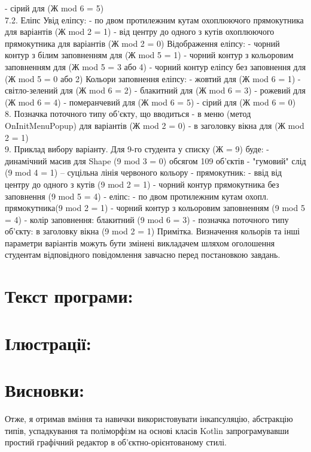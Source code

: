 \documentclass[14pt]{article}
\begin{document}
- сірий для (Ж mod 6 = 5) \\
7.2. Еліпс
Увід еліпсу:
- по двом протилежним кутам охоплюючого прямокутника для
варіантів (Ж mod 2 = 1)
- від центру до одного з кутів охоплюючого прямокутника для варіантів
(Ж mod 2 = 0)
Відображення еліпсу:
- чорний контур з білим заповненням для (Ж mod 5 = 1)
- чорний контур з кольоровим заповненням для (Ж mod 5 = 3 або 4)
- чорний контур еліпсу без заповнення для (Ж mod 5 = 0 або 2)
Кольори заповнення еліпсу:
- жовтий для (Ж mod 6 = 1)
- світло-зелений для (Ж mod 6 = 2)
- блакитний для (Ж mod 6 = 3)
- рожевий для (Ж mod 6 = 4)
- померанчевий для (Ж mod 6 = 5)
- сірий для (Ж mod 6 = 0) \\
8. Позначка поточного типу об’єкту, що вводиться
- в меню (метод OnInitMenuPopup) для варіантів (Ж mod 2 = 0)
- в заголовку вікна для (Ж mod 2 = 1) \\
9. Приклад вибору варіанту. Для 9-го студента у списку (Ж = 9) буде:
- динамічний масив для Shape (9 mod 3 = 0) обсягом 109 об’єктів
- "гумовий" слід (9 mod 4 = 1) – суцільна лінія червоного кольору
- прямокутник:
- ввід від центру до одного з кутів (9 mod 2 = 1)
- чорний контур прямокутника без заповнення (9 mod 5 = 4)
- еліпс:
- по двом протилежним кутам охопл. прямокутника(9 mod 2 = 1)
- чорний контур з кольоровим заповненням (9 mod 5 = 4)
- колір заповнення: блакитний (9 mod 6 = 3)
- позначка поточного типу об’єкту: в заголовку вікна (9 mod 2 = 1)
Примітка. Визначення кольорів та інші параметри варіантів можуть
бути змінені викладачем шляхом оголошення студентам відповідного
повідомлення завчасно перед постановкою завдань.


\section{Текст програми:}


\section{Ілюстрації:}


\section{Висновки:}
Отже, я отримав вміння та навички використовувати інкапсуляцію,
абстракцію типів, успадкування та поліморфізм на основі класів Kotlin
запрограмувавши простий графічний редактор в об’єктно-орієнтованому
стилі.
\end{document}
